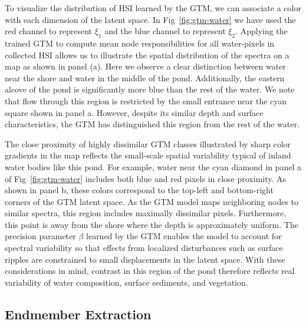 \documentclass[remotesensing,article,submit,pdftex,moreauthors]{Definitions/mdpi}
\begin{document}
To visualize the distribution of HSI learned by the GTM, we can associate a color with each dimension of the latent space. In Fig~\ref{fig:gtm-water} we have used the red channel to represent $\xi_1$ and the blue channel to represent $\xi_2$. Applying the trained GTM to compute mean node responsibilities for all water-pixels in collected HSI allows us to illustrate the spatial distribution of the spectra on a map as shown in panel (a). Here we observe a clear distinction between water near the shore and water in the middle of the pond. Additionally, the eastern alcove of the pond is significantly more blue than the rest of the water. We note that flow through this region is restricted by the small entrance near the cyan square shown in panel a. However, despite its similar depth and surface characteristics, the GTM has distinguished this region from the rest of the water.

The close proximity of highly dissimilar GTM classes illustrated by sharp color gradients in the map reflects the small-scale spatial variability typical of inland water bodies like this pond. For example, water near the cyan diamond in panel a of Fig~\ref{fig:gtm-water} includes both blue and red pixels in close proximity. As shown in panel b, these colors correspond to the top-left and bottom-right corners of the GTM latent space. As the GTM model maps neighboring nodes to similar spectra, this region includes maximally dissimilar pixels. Furthermore, this point is away from the shore where the depth is approximately uniform. The precision parameter $\beta$ learned by the GTM enables the model to account for spectral variability so that effects from localized disturbances such as surface ripples are constrained to small displacements in the latent space. With these considerations in mind, contrast in this region of the pond therefore reflects real variability of water composition, surface sediments, and vegetation.


\subsection{Endmember Extraction}
\end{document}
